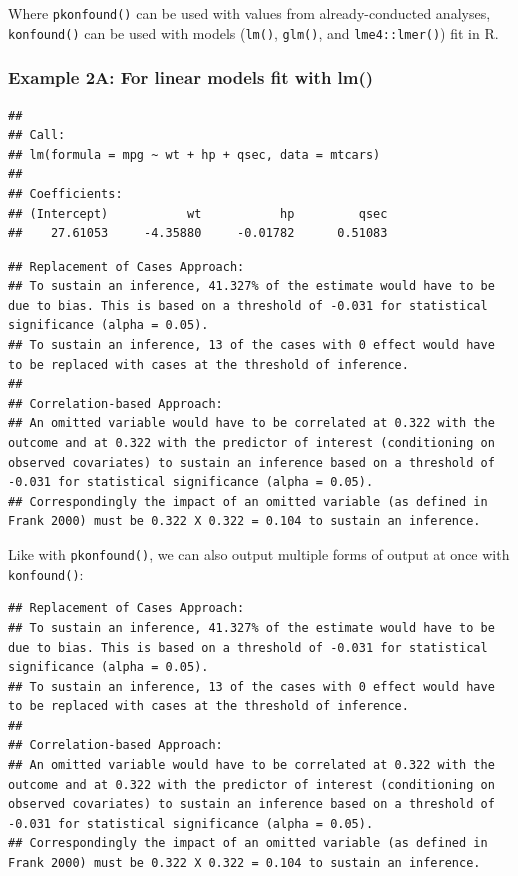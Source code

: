 \documentclass[man]{apa6}
\theoremstyle{definition}
\theoremstyle{definition}
\theoremstyle{definition}
\theoremstyle{remark}
\begin{document}
Where \texttt{pkonfound()} can be used with values from
already-conducted analyses, \texttt{konfound()} can be used with models
(\texttt{lm()}, \texttt{glm()}, and \texttt{lme4::lmer()}) fit in R.

\subsubsection{Example 2A: For linear models fit with
lm()}\label{example-2a-for-linear-models-fit-with-lm}

\begin{verbatim}
## 
## Call:
## lm(formula = mpg ~ wt + hp + qsec, data = mtcars)
## 
## Coefficients:
## (Intercept)           wt           hp         qsec  
##    27.61053     -4.35880     -0.01782      0.51083
\end{verbatim}

\begin{verbatim}
## Replacement of Cases Approach:
## To sustain an inference, 41.327% of the estimate would have to be due to bias. This is based on a threshold of -0.031 for statistical significance (alpha = 0.05).
## To sustain an inference, 13 of the cases with 0 effect would have to be replaced with cases at the threshold of inference.
## 
## Correlation-based Approach:
## An omitted variable would have to be correlated at 0.322 with the outcome and at 0.322 with the predictor of interest (conditioning on observed covariates) to sustain an inference based on a threshold of -0.031 for statistical significance (alpha = 0.05).
## Correspondingly the impact of an omitted variable (as defined in Frank 2000) must be 0.322 X 0.322 = 0.104 to sustain an inference.
\end{verbatim}

Like with \texttt{pkonfound()}, we can also output multiple forms of
output at once with \texttt{konfound()}:

\begin{verbatim}
## Replacement of Cases Approach:
## To sustain an inference, 41.327% of the estimate would have to be due to bias. This is based on a threshold of -0.031 for statistical significance (alpha = 0.05).
## To sustain an inference, 13 of the cases with 0 effect would have to be replaced with cases at the threshold of inference.
## 
## Correlation-based Approach:
## An omitted variable would have to be correlated at 0.322 with the outcome and at 0.322 with the predictor of interest (conditioning on observed covariates) to sustain an inference based on a threshold of -0.031 for statistical significance (alpha = 0.05).
## Correspondingly the impact of an omitted variable (as defined in Frank 2000) must be 0.322 X 0.322 = 0.104 to sustain an inference.
\end{verbatim}
\end{document}

